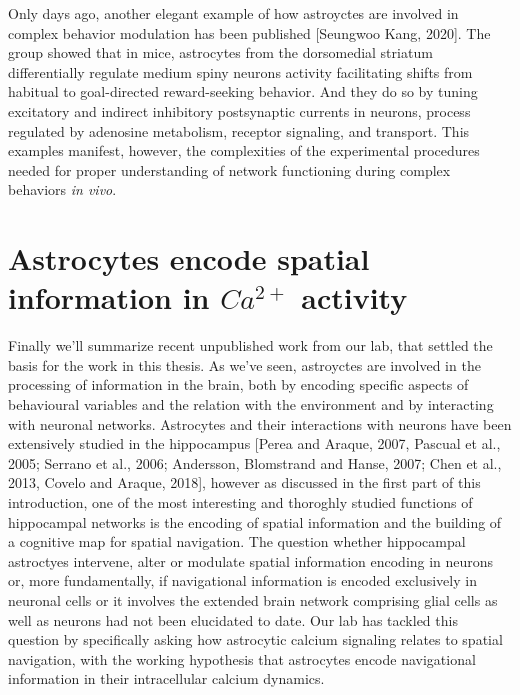 Only days ago, another elegant example of how astroyctes are involved in complex behavior modulation has been published [Seungwoo Kang, 2020]. 
The group showed that in mice, astrocytes from the dorsomedial striatum differentially regulate medium spiny neurons activity facilitating shifts from habitual to goal-directed reward-seeking behavior.
And they do so by tuning excitatory and indirect inhibitory postsynaptic currents in neurons, process regulated by adenosine metabolism, receptor signaling, and transport. 
This examples manifest, however, the complexities of the experimental procedures needed for proper understanding of network functioning during complex behaviors \textit{in vivo}.
\section{Astrocytes encode spatial information in $Ca^{2+}$ activity}
\label{chap1:sec3:astro_spat_info}
Finally we'll summarize recent unpublished work from our lab, that settled the basis for the work in this thesis.
As we've seen, astroyctes are involved in the processing of information in the brain, both by encoding specific aspects of behavioural variables and the relation with the environment and by interacting with neuronal networks. 
Astrocytes and their interactions with neurons have been extensively studied in the hippocampus [Perea and Araque, 2007, Pascual et al., 2005; Serrano et al., 2006; Andersson, Blomstrand and Hanse, 2007; Chen et al., 2013, Covelo and Araque, 2018], however as discussed in the first part of this introduction, one of the most interesting and thoroghly studied functions of hippocampal networks is the encoding of spatial information and the building of a cognitive map for spatial navigation.
The question whether hippocampal astroctyes intervene, alter or modulate spatial information encoding in neurons or, more fundamentally, if navigational information is encoded exclusively in neuronal cells or it involves the extended brain network comprising glial cells as well as neurons had not been elucidated to date. 
Our lab has tackled this question by specifically asking how astrocytic calcium signaling relates to spatial navigation, with the working hypothesis that astrocytes encode navigational information in their intracellular calcium dynamics. 

